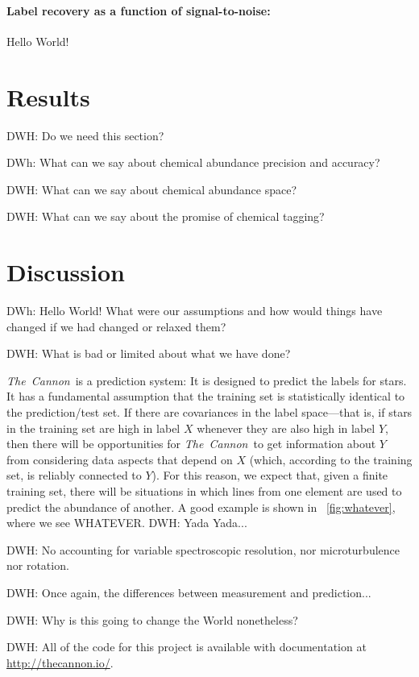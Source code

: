 \documentclass[12pt,preprint]{aastex}
\newcommand{\project}[1]{\textsl{#1}}
\newcommand{\TheCannon}{\project{The~Cannon}}
\begin{document}
\paragraph{Label recovery as a function of signal-to-noise:}
Hello World!

\section{Results}

DWH: Do we need this section?

DWh: What can we say about chemical abundance precision and accuracy?

DWH: What can we say about chemical abundance space?

DWH: What can we say about the promise of chemical tagging?

\section{Discussion}

DWh:  Hello World!  What were our assumptions and how would things have
changed if we had changed or relaxed them?

DWH:  What is bad or limited about what we have done?

\TheCannon\ is a prediction system: It is designed to predict the
labels for stars.
It has a fundamental assumption that the training set is statistically
identical to the prediction/test set.
If there are covariances in the label space---that is, if stars in the
training set are high in label $X$ whenever they are also high in
label $Y$, then there will be opportunities for \TheCannon\ to get
information about $Y$ from considering data aspects that depend on
$X$ (which, according to the training set, is reliably connected to $Y$).
For this reason, we expect that, given a finite training set, there
will be situations in which lines from one element are used to predict
the abundance of another.
A good example is shown in \figurenmae~\ref{fig:whatever}, where we
see WHATEVER.
DWH: Yada Yada...

DWH: No accounting for variable spectroscopic resolution, nor
microturbulence nor rotation.

DWH:  Once again, the differences between measurement and prediction...

DWH:  Why is this going to change the World nonetheless?

DWH: All of the code for this project is available with documentation
at \url{http://thecannon.io/}.
\end{document}
